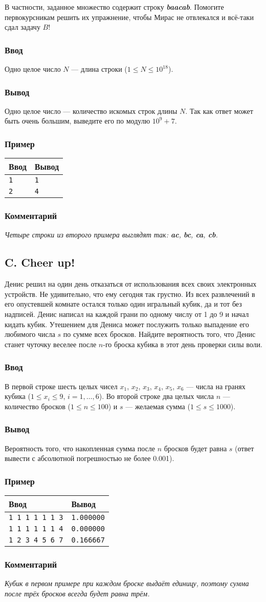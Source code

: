 \documentclass[10pt, a4paper]{article}
\newcommand{\informat}[1]
{
	\subsubsection*{Ввод} #1
}
\newcommand{\outformat}[1]
{
	\subsubsection*{Вывод} #1
}
\newcommand{\examplee}[4]
{
	\subsubsection*{Пример}
	\noindent
	\begin{center}
	\begin{tabularx}{\linewidth}{|X|X|}
	\hline
	Ввод 	& Вывод  	\\
	\hline
	{\tt #1} & {\tt #2}	\\
	\hline
	{\tt #3} & {\tt #4}	\\
	\hline
	\end{tabularx}
	\end{center}
}
\newcommand{\exampleee}[6]
{
	\subsubsection*{Пример}
	\noindent
	\begin{center}
	\begin{tabularx}{\linewidth}{|X|X|}
	\hline
	Ввод 	& Вывод  	\\
	\hline
	{\tt #1} & {\tt #2}	\\
	\hline
	{\tt #3} & {\tt #4}	\\
	\hline
	{\tt #5} & {\tt #6}	\\
	\hline
	\end{tabularx}
	\end{center}
}
\newcommand{\excomm}[1]
{
	\subsubsection*{Комментарий}
	\textit{#1}
}
\begin{document}
В частности, заданное множество содержит строку \textit{\textbf{baacab}}. Помогите первокурсникам решить их упражнение, чтобы Мирас не отвлекался и всё-таки сдал задачу $B$!

\informat{Одно целое число $N$ --- длина строки ($1 \le N \le {10}^{18}$).}

\outformat{Одно целое число --- количество искомых строк длины $N$. Так как ответ может быть очень большим, выведите его по модулю $10^9+7$.}

\examplee{1}{1}{2}{4}

\excomm{Четыре строки из второго примера выглядят так: \textit{\textbf{ac}}, \textit{\textbf{bc}}, \textit{\textbf{ca}}, \textit{\textbf{cb}}.}



\subsection*{C. Cheer up!}

Денис решил на один день отказаться от использования всех своих электронных устройств. Не удивительно, что ему сегодня так грустно. Из всех развлечений в его опустевшей комнате остался только один игральный кубик, да и тот без надписей. Денис написал на каждой грани по одному числу от 1 до 9 и начал кидать кубик. Утешением для Дениса может послужить только выпадение его любимого числа $s$ по сумме всех бросков. Найдите вероятность того, что Денис станет чуточку веселее после $n$-го броска кубика в этот день проверки силы воли.

\informat{В первой строке шесть целых чисел $x_1$, $x_2$, $x_3$, $x_4$, $x_5$, $x_6$ --- числа на гранях кубика ($1 \le x_i \le 9$, $i = 1, \dots, 6$). Во второй строке два целых числа $n$ --- количество бросков ($1 \le n \le 100$) и $s$ --- желаемая сумма ($1 \le s \le 1000$).}

\outformat{Вероятность того, что накопленная сумма после $n$ бросков будет равна $s$ (ответ вывести с абсолютной погрешностью не более 0.001).}

\exampleee{1 1 1 1 1 1 \newline 3 3}{1.000000}{1 1 1 1 1 1 \newline 3 4}{0.000000}{1 2 3 4 5 6 \newline 2 7}{0.166667}

\excomm{Кубик в первом примере при каждом броске выдаёт единицу, поэтому сумма после трёх бросков всегда будет равна трём.}
\end{document}
